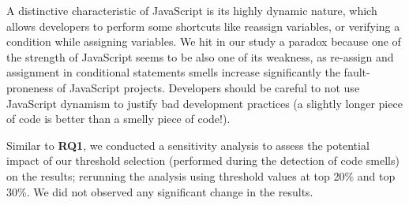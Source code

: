 \documentclass[smallcondensed]{svjour3}
\begin{document}
{\color{blue} A distinctive characteristic of JavaScript is its highly dynamic nature, which allows developers to perform some shortcuts like reassign variables, or verifying a condition while assigning variables. We hit in our study a paradox because one of the strength of JavaScript seems to be also one of its weakness, as re-assign and assignment in conditional statements smells increase significantly the fault-proneness of JavaScript projects. Developers should be careful to not use JavaScript dynamism to justify bad development practices (a slightly longer piece of code is better than a smelly piece of code!).}


Similar to \textbf{RQ1}, we conducted a sensitivity analysis to assess the potential impact of our threshold selection (performed during the detection of code smells) on the results; rerunning the analysis using threshold values at top 20\% and top 30\%. We did not observed any significant change in the results.

\end{document}
